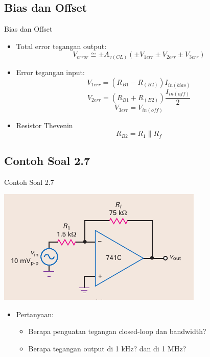 \subsection{Bias dan Offset}
\begin{frame}{Bias dan Offset}
	\begin{itemize}
		\item Total error tegangan output:
		\begin{equation}\label{pers.16.7}
			V_{error} \cong \pm A_{v(CL)} (\pm V_{1err} \pm V_{2err} \pm V_{3err} )
		\end{equation}
		\item Error tegangan input:
		\begin{equation}\label{pers.16.8}
			V_{1err} = (R_{B1} - R_{(B2)}) I_{in(bias)}
		\end{equation}
		\begin{equation}\label{pers.16.9}
			V_{2err} = (R_{B1} + R_{(B2)}) \frac{I_{in(off)}}{2}
		\end{equation}
		\begin{equation}\label{pers.16.10}
			V_{3err} = V_{in(off)}
		\end{equation}
		\item Resistor Thevenin
		\begin{equation}\label{pers.16.11}
			R_{B2} = R_1 \parallel R_f
		\end{equation}
	\end{itemize}
\end{frame}

\subsection{Contoh Soal 2.7}
\begin{frame}{Contoh Soal 2.7}
	\begin{multicols}{2}
		\begin{center}
			\includegraphics[width=\linewidth]{gambar/fig-16.16a}
		\end{center}
		\columnbreak
		\begin{itemize}
			\item Pertanyaan:
			\begin{itemize}
				\item Berapa penguatan tegangan closed-loop dan bandwidth?
				\item Berapa tegangan output di 1 kHz? dan di 1 MHz?
			\end{itemize}
		\end{itemize}
	\end{multicols}
\end{frame}